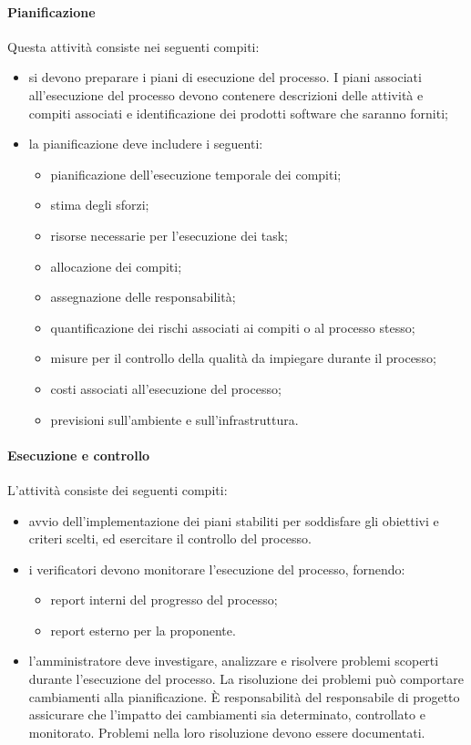 		\paragraph{Pianificazione}
		Questa attività consiste nei seguenti compiti:
		\begin{itemize}
			\item si devono preparare i piani di esecuzione del processo. I piani associati all'esecuzione del processo devono contenere descrizioni delle attività e compiti associati e  identificazione dei prodotti software che saranno forniti;
			\item la pianificazione deve includere i seguenti:
			\begin{itemize}
				\item pianificazione dell'esecuzione temporale dei compiti;
				\item stima degli sforzi;
				\item risorse necessarie per l'esecuzione dei task;
				\item allocazione dei compiti;
				\item assegnazione delle responsabilità;
				\item quantificazione dei rischi associati ai compiti o al processo stesso;
				\item misure per il controllo della qualità da impiegare durante il processo;
				\item costi associati all'esecuzione del processo;
				\item previsioni sull'ambiente e sull'infrastruttura. 
			\end{itemize}
		\end{itemize}
		\paragraph{Esecuzione e controllo}
		L'attività consiste dei seguenti compiti:
		\begin{itemize}
			\item avvio dell'implementazione dei piani stabiliti per soddisfare gli obiettivi e criteri scelti, ed esercitare il controllo del processo.
			\item i verificatori devono monitorare l'esecuzione del processo, fornendo:
			\begin{itemize}
				\item report interni del progresso del processo;
				\item report esterno per la proponente.
			\end{itemize}
			\item l'amministratore deve investigare, analizzare e risolvere problemi scoperti durante l'esecuzione del processo. La risoluzione dei problemi può comportare cambiamenti alla pianificazione. È responsabilità del responsabile di progetto assicurare che l'impatto dei cambiamenti sia determinato, controllato e monitorato. Problemi nella loro risoluzione devono essere documentati.
		\end{itemize}
